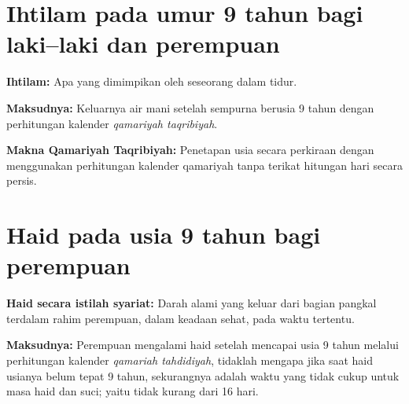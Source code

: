 \section{Ihtilam pada umur 9 tahun bagi laki–laki dan perempuan}

\textbf{Ihtilam:} Apa yang dimimpikan oleh seseorang dalam tidur.

\textbf{Maksudnya:} Keluarnya air mani setelah sempurna berusia 9 tahun dengan perhitungan kalender \textit{qamariyah taqribiyah}.

\textbf{Makna Qamariyah Taqribiyah:} Penetapan usia secara perkiraan dengan menggunakan perhitungan kalender qamariyah tanpa terikat hitungan hari secara persis.

\section{Haid pada usia 9 tahun bagi perempuan}

\textbf{Haid secara istilah syariat:} Darah alami yang keluar dari bagian pangkal terdalam rahim perempuan, dalam keadaan sehat, pada waktu tertentu.

\textbf{Maksudnya:} Perempuan mengalami haid setelah mencapai usia 9 tahun melalui perhitungan kalender \textit{qamariah tahdidiyah}, tidaklah mengapa jika saat haid usianya belum tepat 9 tahun, sekurangnya adalah waktu yang tidak cukup untuk masa haid dan suci; yaitu tidak kurang dari 16 hari. 